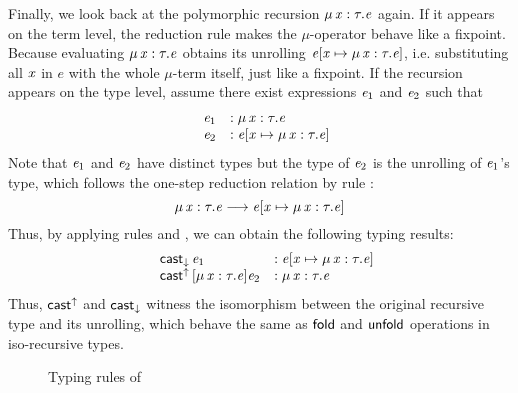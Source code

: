 Finally, we look back at the polymorphic recursion $\mu \, \mathit{x}  :  \tau  .  \mathit{e}$ again. If it appears on the term level, the reduction rule  makes the $ \mu $-operator behave like a fixpoint. Because evaluating $\mu \, \mathit{x}  :  \tau  .  \mathit{e}$ obtains its unrolling $\mathit{e}  [  \mathit{x}  \mapsto  \mu \, \mathit{x}  :  \tau  .  \mathit{e}  ]$, i.e. substituting all $\mathit{x}$ in $e$ with the whole $ \mu $-term itself, just like a fixpoint. If the recursion appears on the type level, assume there exist expressions $\mathit{e_{{\mathrm{1}}}}$ and $\mathit{e_{{\mathrm{2}}}}$ such that 
\[\begin{array}{lll}
	&\mathit{e_{{\mathrm{1}}}} &: \mu \, \mathit{x}  :  \tau  .  \mathit{e}\\
	&\mathit{e_{{\mathrm{2}}}} &: \mathit{e}  [  \mathit{x}  \mapsto  \mu \, \mathit{x}  :  \tau  .  \mathit{e}  ]
\end{array}\]
Note that $\mathit{e_{{\mathrm{1}}}}$ and $\mathit{e_{{\mathrm{2}}}}$ have distinct types but the type of $\mathit{e_{{\mathrm{2}}}}$ is the unrolling of $\mathit{e_{{\mathrm{1}}}}$'s type, which follows the one-step reduction relation by rule :
\[ \mu \, \mathit{x}  :  \tau  .  \mathit{e}  \longrightarrow  \mathit{e}  [  \mathit{x}  \mapsto  \mu \, \mathit{x}  :  \tau  .  \mathit{e}  ] \]
 Thus, by applying rules  and , we can obtain the following typing results:
\[\begin{array}{lll}
	&\mathsf{cast}_{\downarrow} \, \mathit{e_{{\mathrm{1}}}} &: \mathit{e}  [  \mathit{x}  \mapsto  \mu \, \mathit{x}  :  \tau  .  \mathit{e}  ]\\
	&\mathsf{cast}^{\uparrow} \, [  \mu \, \mathit{x}  :  \tau  .  \mathit{e}  ]  \mathit{e_{{\mathrm{2}}}} &: \mu \, \mathit{x}  :  \tau  .  \mathit{e}
\end{array}\]
Thus, $ \mathsf{cast}^{\uparrow} $ and $ \mathsf{cast}_{\downarrow} $ witness the isomorphism between the original recursive type and its unrolling, which behave the same as $\mathsf{fold}$ and $\mathsf{unfold}$ operations in iso-recursive types.

\begin{figure}
    \ottdefnctx{}
    \ottdefnexpr{}
    \caption{Typing rules of \name}
    \label{fig:core:typing}
\end{figure}

